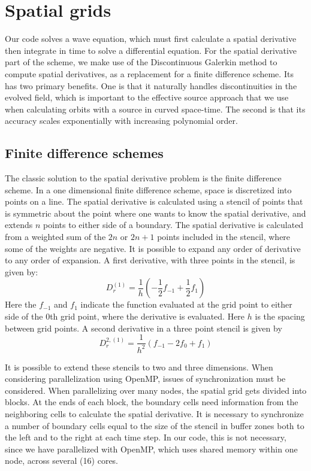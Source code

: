 \section{Spatial grids}
Our code solves a wave equation, which must first calculate a spatial derivative then integrate in time to solve a differential equation. For the spatial derivative part of the scheme, we make use of the Discontinuous Galerkin method to compute spatial derivatives, as a replacement for a finite difference scheme. Its has two primary benefits. One is that it naturally handles discontinuities in the evolved field, which is important to the effective source approach that we use when calculating orbits with a source in curved space-time. The second is that its accuracy scales exponentially with increasing polynomial order. 


\subsection{Finite difference schemes}
The classic solution to the spatial derivative problem is the finite difference scheme. In a one dimensional finite difference scheme, space is discretized into points on a line. The spatial derivative is calculated using a stencil of points that is symmetric about the point where one wants to know the spatial derivative, and extends $n$ points to either side of a boundary. The spatial derivative is calculated from a weighted sum of the $2n$ or $2n+1$ points included in the stencil, where some of the weights are negative. It is possible to expand any order of derivative to any order of expansion. A first derivative, with three points in the stencil, is given by:
\begin{equation}
  D_r^{(1)}=\frac{1}{h}(-\frac{1}{2}f_{-1}+\frac{1}{2}f_1)
\end{equation}
Here the $f_{-1}$ and $f_1$ indicate the function evaluated at the grid point to either side of the $0$th grid point, where the derivative is evaluated. Here $h$ is the spacing between grid points. A second derivative in a three point stencil is given by 
\begin{equation}
  D^{2,(1)}_r=\frac{1}{h^2}(f_{-1}-2f_0+f_1)
\end{equation}

It is possible to extend these stencils to two and three dimensions. When considering parallelization using OpenMP, issues of synchronization must be considered. When parallelizing over many nodes, the spatial grid gets divided into blocks. At the ends of each block, the boundary cells need information from the neighboring cells to calculate the spatial derivative. It is necessary to synchronize a number of boundary cells equal to the size of the stencil in buffer zones both to the left and to the right at each time step. In our code, this is not necessary, since we have parallelized with OpenMP, which uses shared memory within one node, across several (16) cores.

